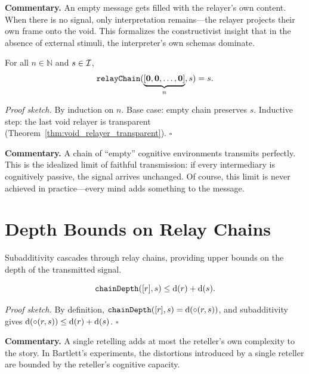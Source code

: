 \medskip

\noindent\textbf{Commentary.}
An empty message gets filled with the relayer's own content.  When there is
no signal, only interpretation remains---the relayer projects their own
frame onto the void.  This formalizes the constructivist insight that in the
absence of external stimuli, the interpreter's own schemas dominate.

\begin{theorem}
\label{thm:void_chain_identity}
For all $n \in \mathbb{N}$ and $s \in \mathcal{I}$,
\[
  \texttt{relayChain}(\underbrace{[\mathbf{0}, \mathbf{0}, \ldots, \mathbf{0}]}_{n}, s) = s.
\]
\end{theorem}

\noindent\textit{Proof sketch.}\quad
By induction on $n$.  Base case: empty chain preserves $s$.  Inductive step:
the last void relayer is transparent (Theorem~\ref{thm:void_relayer_transparent}).
\hfill$\square$

\medskip

\noindent\textbf{Commentary.}
A chain of ``empty'' cognitive environments transmits perfectly.  This is
the idealized limit of faithful transmission: if every intermediary is
cognitively passive, the signal arrives unchanged.  Of course, this limit is
never achieved in practice---every mind adds something to the message.

\section{Depth Bounds on Relay Chains}
\label{sec:ch18-depth}

Subadditivity cascades through relay chains, providing upper bounds on the
depth of the transmitted signal.

\begin{theorem}
\label{thm:single_relay_depth}
\[
  \texttt{chainDepth}([r], s) \leq \operatorname{d}(r) + \operatorname{d}(s).
\]
\end{theorem}

\noindent\textit{Proof sketch.}\quad
By definition, $\texttt{chainDepth}([r], s) = \operatorname{d}(\circ(r, s))$,
and subadditivity gives $\operatorname{d}(\circ(r,s)) \leq \operatorname{d}(r) + \operatorname{d}(s)$.
\hfill$\square$

\medskip

\noindent\textbf{Commentary.}
A single retelling adds at most the reteller's own complexity to the story.
In Bartlett's experiments, the distortions introduced by a single reteller
are bounded by the reteller's cognitive capacity.

